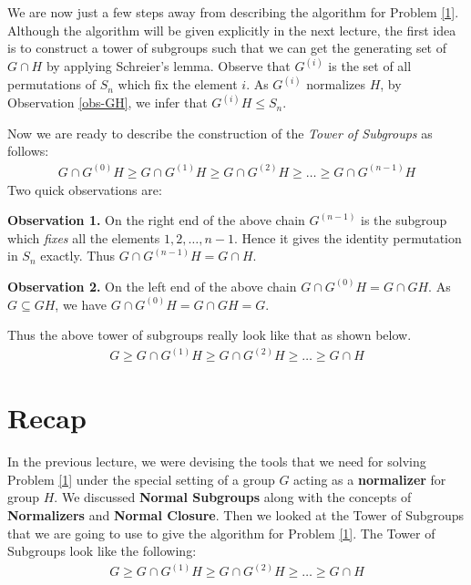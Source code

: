 
We are now just a few steps away from describing the algorithm for Problem \ref{1}. Although the algorithm will be given explicitly in the next lecture, the first idea is to construct a tower of subgroups such that we can get the generating set of $G\cap H$ by applying Schreier's lemma.
Observe that $G^{(i)}$ is the set of all permutations of $S_n$ which fix the element $i$. As $G^{(i)}$ normalizes $H$, by Observation \ref{obs-GH}, we infer that $G^{(i)}H\leq S_n$. 

Now we are ready to describe the construction of the \emph{Tower of Subgroups} as follows:
\begin{eqnarray*}
G\cap G^{(0)}H \geq G\cap G^{(1)}H \geq G\cap G^{(2)}H \geq \ldots \geq G\cap G^{(n-1)}H
\end{eqnarray*}
Two quick observations are:

{\bf Observation 1.} On the right end of the above chain $G^{(n-1)}$ is the subgroup which \emph{fixes} all the elements $1,2,\ldots,n-1$. Hence it gives the identity permutation in $S_n$ exactly. Thus $G\cap G^{(n-1)}H  = G\cap H$.

{\bf Observation 2.} On the left end of the above chain $G\cap G^{(0)}H = G \cap GH$. As $G\subseteq GH$, we have $G\cap G^{(0)}H = G\cap GH = G$.   

Thus the above tower of subgroups really look like that as shown below.
\begin{eqnarray*}
	G\geq G\cap G^{(1)}H \geq G\cap G^{(2)}H \geq \ldots \geq G\cap H
\end{eqnarray*}




\section{Recap}
In the previous lecture, we were devising the tools that we need for solving Problem \ref{1} under the special setting of a group $G$ acting as a {\bf normalizer} for group $H$. We discussed {\bf Normal Subgroups} along with the concepts of {\bf Normalizers} and {\bf Normal Closure}. Then we looked at the Tower of Subgroups that we are going to use to give the algorithm for Problem \ref{1}. The Tower of Subgroups look like the following:
\begin{eqnarray*}
	G\geq G\cap G^{(1)}H \geq G\cap G^{(2)}H \geq \ldots \geq G\cap H
\end{eqnarray*}
